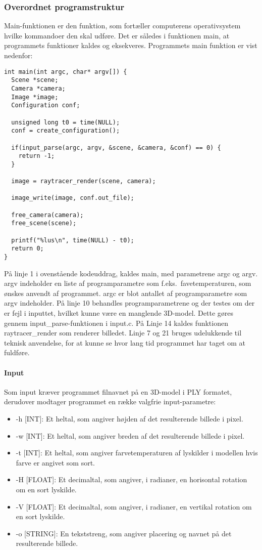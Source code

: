 \subsubsection{Overordnet programstruktur}
Main-funktionen er den funktion, som fortæller computerens operativsystem hvilke kommandoer den skal udføre. Det er således i funktionen main, at programmets funktioner kaldes og eksekveres. Programmets main funktion er vist nedenfor:

\begin{lstlisting}[style=Cstyle, caption=Main]
int main(int argc, char* argv[]) {
  Scene *scene;
  Camera *camera;
  Image *image;
  Configuration conf;

  unsigned long t0 = time(NULL);
  conf = create_configuration();
  
  if(input_parse(argc, argv, &scene, &camera, &conf) == 0) {
    return -1;
  }
  
  image = raytracer_render(scene, camera);
  
  image_write(image, conf.out_file);

  free_camera(camera);
  free_scene(scene);
  
  printf("%lus\n", time(NULL) - t0);
  return 0;
}
\end{lstlisting}

På linje 1 i ovenstående kodeuddrag, kaldes main, med parametrene argc og argv. argv indeholder en liste af programparametre som f.eks.\ favetemperaturen, som ønskes anvendt af programmet. argc er blot antallet af programparametre som argv indeholder. På linje 10 behandles programparametrene og der testes om der er fejl i inputtet, hvilket kunne være en manglende 3D-model. Dette gøres gennem input\_parse-funktionen i input.c. På Linje 14 kaldes funktionen raytracer\_render som renderer billedet. Linje 7 og 21 bruges udelukkende til teknisk anvendelse, for at kunne se hvor lang tid programmet har taget om at fuldføre.

\paragraph{Input}
Som input kræver programmet filnavnet på en 3D-model i PLY formatet, derudover modtager programmet en række valgfrie input-parametre:
\begin{itemize}
  \item -h [INT]: Et heltal, som angiver højden af det resulterende billede i pixel.
  \item -w [INT]: Et heltal, som angiver breden af det resulterende billede i pixel.
  \item -t [INT]: Et heltal, som angiver farvetemperaturen af lyskilder i modellen hvis farve er angivet som sort.
  \item -H [FLOAT]: Et decimaltal, som angiver, i radianer, en horisontal rotation om en sort lyskilde.
  \item -V [FLOAT]: Et decimaltal, som angiver, i radianer, en vertikal rotation om en sort lyskilde.
  \item -o [STRING]: En tekststreng, som angiver placering og navnet på det resulterende billede.
\end{itemize}


